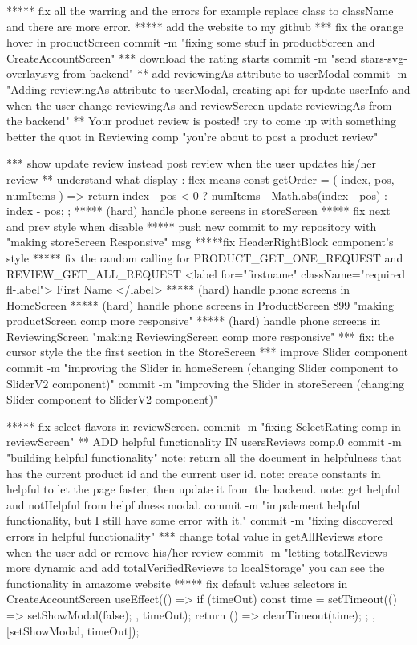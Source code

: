 {***** fix all the warring and the errors for example replace class to className and there are more error.
***** add the website to my github
 *** fix the orange hover in productScreen
    commit -m "fixing some stuff in productScreen and CreateAccountScreen"
*** download the rating starts
    commit -m "send stars-svg-overlay.svg from backend"
** add reviewingAs attribute to userModal
    commit -m "Adding reviewingAs attribute to userModal, creating api for update userInfo and when the user change reviewingAs and reviewScreen update reviewingAs from the backend"
** Your product review is posted!  try to come up with something better the quot in Reviewing comp 
        "you're about to post a product review"

*** show update review instead post review when the user updates his/her review
** understand what display : flex means
      const getOrder = ({ index, pos, numItems }) => {
        return index - pos < 0 ? numItems - Math.abs(index - pos) : index - pos;
      };
 ***** (hard) handle phone screens in storeScreen
 ***** fix next and prev style when disable
***** push new commit to my repository with "making storeScreen Responsive" msg
*****fix HeaderRightBlock component's style
***** fix the random calling for PRODUCT_GET_ONE_REQUEST and REVIEW_GET_ALL_REQUEST
      <label for="firstname" className="required fl-label">
                          First Name
                        </label>
***** (hard) handle phone screens in HomeScreen
***** (hard) handle phone screens in ProductScreen 899 "making productScreen comp more responsive"
***** (hard) handle phone screens in ReviewingScreen "making ReviewingScreen comp more responsive"
*** fix: the cursor style the the first section in the StoreScreen
*** improve Slider component
    commit -m "improving the Slider in homeScreen (changing Slider component to SliderV2 component)"
    commit -m "improving the Slider in storeScreen (changing Slider component to SliderV2 component)"

***** fix select flavors in reviewScreen.
    commit -m "fixing SelectRating comp in reviewScreen"
** ADD helpful functionality IN usersReviews comp.0
        commit -m "building helpful functionality"
        note: return all the document in helpfulness that has the current product id and the current user id.
        note: create constants in helpful to let the page faster, then update it from the backend.
        note: get helpful and notHelpful from helpfulness modal.
        commit -m "impalement helpful functionality, but I still have some error with it."
        commit -m "fixing discovered errors in helpful functionality"
*** change total value in getAllReviews store when the user add or remove his/her review
    commit -m "letting totalReviews more dynamic and add totalVerifiedReviews to localStorage"
      you can see the functionality in amazome website
***** fix default values selectors in CreateAccountScreen 
     useEffect(() => {
    if (timeOut) {
      const time = setTimeout(() => {
        setShowModal(false);
      }, timeOut);
      return () => {
        clearTimeout(time);
      };
    }
  }, [setShowModal, timeOut]);

}
